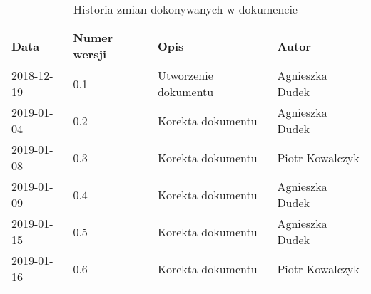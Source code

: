 \documentclass{article}
\begin{document}
\begin{titlepage}






\end{titlepage}

\addtocounter{page}{1}
\newpage

\begin{table}[h!]
	\begin{center}
		\caption{Historia zmian dokonywanych w dokumencie}
		\begin{tabular}{|l|l|l|l|}
			\hline
			Data & Numer wersji & Opis & Autor \\
			\hline \hline
			2018-12-19 & 0.1 & Utworzenie dokumentu & Agnieszka Dudek \\
			\hline
			2019-01-04 & 0.2 & Korekta dokumentu & Agnieszka Dudek \\
			\hline
			2019-01-08 & 0.3 & Korekta dokumentu & Piotr Kowalczyk \\
			\hline 
			2019-01-09 & 0.4 & Korekta dokumentu & Agnieszka Dudek \\
			\hline 
			2019-01-15 & 0.5 & Korekta dokumentu & Agnieszka Dudek \\
			\hline 
			2019-01-16 & 0.6 & Korekta dokumentu & Piotr Kowalczyk \\
			\hline 


    \end{tabular}
	\end{center}
\end{table}	
\end{document}
